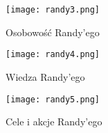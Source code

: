 \begin{figure}[h!]
    \centering
    \texttt{[image: randy3.png]}
    \caption{Osobowość Randy'ego}
    \label{fig:app1_randy_3}
\end{figure}

\begin{figure}[h!]
    \centering
    \texttt{[image: randy4.png]}
    \caption{Wiedza Randy'ego}
    \label{fig:app1_randy_4}
\end{figure}

\begin{figure}[h!]
    \centering
    \texttt{[image: randy5.png]}
    \caption{Cele i akcje Randy'ego}
    \label{fig:app1_randy_5}
\end{figure}